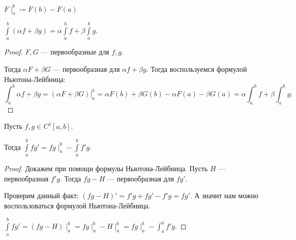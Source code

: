 \begin{definition}
    $F\mid_a^b \coloneqq F(b) - F(a)$
\end{definition}
\begin{theorem}
    $\int\limits_a^b(\alpha f + \beta g) = \alpha \int\limits_a^b f + \beta \int\limits_a^b g$.
\end{theorem}
\begin{proof}
    $F, G$ --- первообразные для  $f, g$.

    Тогда  $\alpha F + \beta G$ --- первообразная для  $\alpha f + \beta g$. Тогда воспользуемся формулой Ньютона-Лейбница:  \[
	    \int_a^b \alpha f + \beta g = \left.\left(\alpha F + \beta G\right)\right|_a^b = \alpha F(b) + \beta G(b) - \alpha F(a) - \beta G(a) = \alpha \int_a^b f + \beta \int_a^b g
    .\] 
\end{proof}
\begin{theorem}
    Пусть $f, g \in C^{1}[a, b]$.

    Тогда  $\int\limits_a^b fg' = fg \mid_a^b - \int\limits_a^bf'g$.
\end{theorem}
\begin{proof}
    Докажем при помощи формулы Ньютона-Лейбница. Пусть $H$ --- первообразная  $f'g$. Тогда  $fg - H$ --- первообразная для $fg'$.

    Проверим данный факт: $\left(fg - H\right)' = f'g + fg' - f'g = fg'$. А значит нам можно воспользоваться формулой Ньютона-Лейбница.

    $\int\limits_a^b fg' = \left(fg - H\right) \mid_a^b = fg \mid_a^b - H\mid_a^b = fg\mid_a^b - \int_a^b f'g$.
\end{proof}

